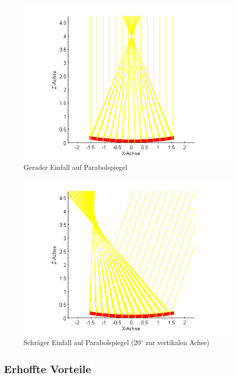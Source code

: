 \documentclass[fontsize=10pt,paper=a4,bibliography=totoc]{scrartcl}
\begin{document}
\begin{figure}[ht]
	\centering
	\includegraphics[width=\textwidth]{images/2d_gerade}
	\caption{Gerader Einfall auf Parabolspiegel}
	\label{pic:2dreflektion}
\end{figure}
\begin{figure}[ht]
	\centering
	\includegraphics[width=\textwidth]{images/2d_schraeg_20_grad}
	\caption{Schräger Einfall auf Parabolspiegel (20$^{\circ}$ zur vertikalen Achse)}
	\label{pic:2dreflektion_schraeg}
\end{figure}

\subsection{Erhoffte Vorteile}
\end{document}
